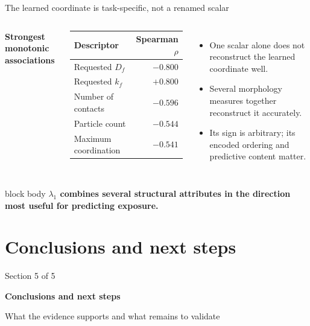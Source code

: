 \documentclass[aspectratio=169,11pt]{beamer}
\newcommand{\hi}[1]{\textcolor{tumblue}{\textbf{#1}}}
\newcommand{\takeaway}[1]{%
	\begin{beamercolorbox}[rounded=true,sep=.55em]{block body}
		\centering\color{tumdark}\textbf{#1}
\end{beamercolorbox}}
\begin{document}
\begin{frame}{The learned coordinate is task-specific, not a renamed scalar}
  \begin{columns}[c,onlytextwidth]
      \hi{Strongest monotonic associations}
      \begin{table}
        \centering\small
        \begin{tabular}{lr}
          \toprule
          Descriptor & Spearman $\rho$\\
          \midrule
          Requested $D_f$ & $-0.800$\\
          Requested $k_f$ & $+0.800$\\
          Number of contacts & $-0.596$\\
          Particle count & $-0.544$\\
          Maximum coordination & $-0.541$\\
          \bottomrule
        \end{tabular}
      \end{table}
      \begin{itemize}
        \item One scalar alone does not reconstruct the learned coordinate well.
        \item Several morphology measures together reconstruct it accurately.
        \item Its sign is arbitrary; its encoded ordering and predictive content matter.
      \end{itemize}
  \end{columns}
  \vspace{.2cm}
  \takeaway{$\lambda_1$ combines several structural attributes in the direction most useful for predicting exposure.}
\end{frame}

\section[Conclusions]{Conclusions and next steps}
\begin{frame}{}
  \vfill
  {\large\color{tumgray}Section 5 of 5}\par\vspace{0.4cm}
  {\LARGE\color{tumblue}\textbf{Conclusions and next steps}}\par\vspace{0.5cm}
  {\large What the evidence supports and what remains to validate}
  \vfill
\end{frame}
\end{document}
